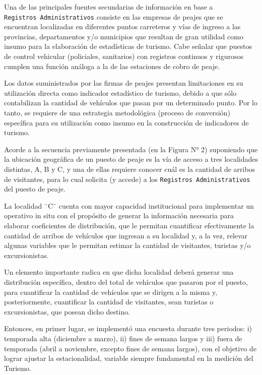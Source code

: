 \documentclass[
]{book}
\begin{document}
Una de las principales fuentes secundarias de información en base a \texttt{Registros\ Administrativos} consiste en las empresas de peajes que se encuentran localizadas en diferentes puntos carreteros y vías de ingreso a las provincias, departamentos y/o municipios que resultan de gran utilidad como insumo para la elaboración de estadísticas de turismo. Cabe señalar que puestos de control vehicular (policiales, sanitarios) con registros continuos y rigurosos cumplen una función análoga a la de las estaciones de cobro de peaje.

Los datos suministrados por las firmas de peajes presentan limitaciones en su utilización directa como indicador estadístico de turismo, debido a que sólo contabilizan la cantidad de vehículos que pasan por un determinado punto. Por lo tanto, se requiere de una estrategia metodológica (proceso de conversión) específica para su utilización como insumo en la construcción de indicadores de turismo.

Acorde a la secuencia previamente presentada (en la Figura N° 2) suponiendo que la ubicación geográfica de un puesto de peaje es la vía de acceso a tres localidades distintas, A, B y C, y una de ellas requiere conocer cuál es la cantidad de arribos de visitantes, para lo cual solicita (y accede) a los \texttt{Registros\ Administrativos} del puesto de peaje.

La localidad ¨C¨ cuenta con mayor capacidad institucional para implementar un operativo in situ con el propósito de generar la información necesaria para elaborar coeficientes de distribución, que le permitan cuantificar efectivamente la cantidad de arribos de vehículos que ingresan a su localidad y, a la vez, relevar algunas variables que le permitan estimar la cantidad de visitantes, turistas y/o excursionistas.

Un elemento importante radica en que dicha localidad deberá generar una distribución específica, dentro del total de vehículos que pasaron por el puesto, para cuantificar la cantidad de vehículos que se dirigen a la misma y, posteriormente, cuantificar la cantidad de visitantes, sean turistas o excursionistas, que posean dicho destino.

Entonces, en primer lugar, se implementó una encuesta durante tres periodos: i) temporada alta (diciembre a marzo), ii) fines de semana largos y iii) fuera de temporada (abril a noviembre, excepto fines de semana largos), con el objetivo de lograr ajustar la estacionalidad, variable siempre fundamental en la medición del Turismo.
\end{document}

